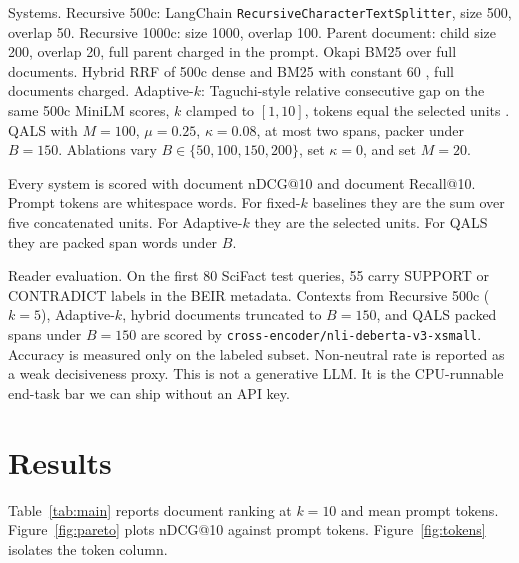 \documentclass[preprint,12pt,authoryear]{elsarticle}
\begin{document}
Systems. Recursive 500c: LangChain \texttt{RecursiveCharacterTextSplitter}, size 500, overlap 50. Recursive 1000c: size 1000, overlap 100. Parent document: child size 200, overlap 20, full parent charged in the prompt. Okapi BM25 over full documents. Hybrid RRF of 500c dense and BM25 with constant 60 \citep{cormack2009reciprocal}, full documents charged. Adaptive-\(k\): Taguchi-style relative consecutive gap on the same 500c MiniLM scores, \(k\) clamped to \([1,10]\), tokens equal the selected units \citep{taguchi2025adaptivek}. QALS with \(M=100\), \(\mu=0.25\), \(\kappa=0.08\), at most two spans, packer under \(B=150\). Ablations vary \(B\in\{50,100,150,200\}\), set \(\kappa=0\), and set \(M=20\).

Every system is scored with document nDCG@10 and document Recall@10. Prompt tokens are whitespace words. For fixed-\(k\) baselines they are the sum over five concatenated units. For Adaptive-\(k\) they are the selected units. For QALS they are packed span words under \(B\).

Reader evaluation. On the first 80 SciFact test queries, 55 carry SUPPORT or CONTRADICT labels in the BEIR metadata. Contexts from Recursive 500c (\(k=5\)), Adaptive-\(k\), hybrid documents truncated to \(B=150\), and QALS packed spans under \(B=150\) are scored by \texttt{cross-encoder/nli-deberta-v3-xsmall}. Accuracy is measured only on the labeled subset. Non-neutral rate is reported as a weak decisiveness proxy. This is not a generative LLM. It is the CPU-runnable end-task bar we can ship without an API key.

\section{Results}
\label{sec:results}
Table~\ref{tab:main} reports document ranking at \(k=10\) and mean prompt tokens. Figure~\ref{fig:pareto} plots nDCG@10 against prompt tokens. Figure~\ref{fig:tokens} isolates the token column.
\end{document}
